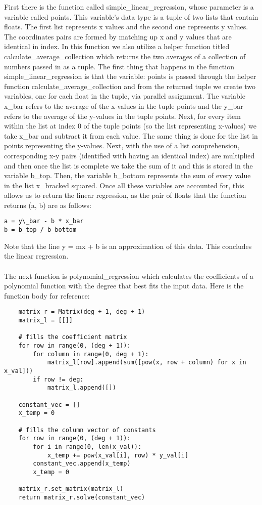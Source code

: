 \documentclass[fontsize=11pt]{article}
\begin{document}
First there is the function called simple\_linear\_regression, whose parameter is a variable called points. This variable’s data type is a tuple of two lists that contain floats. The first list represents x values and the second one represents y values. The coordinates pairs are formed by matching up x and y values that are identical in index. In this function we also utilize a helper function titled calculate\_average\_collection which returns the two averages of a collection of numbers passed in as a tuple. The first thing that happens in the function simple\_linear\_regression is that the variable: points is passed through the helper function calculate\_average\_collection and from the returned tuple we create two variables, one for each float in the tuple, via parallel assignment. The variable x\_bar refers to the average of the x-values in the tuple points and the y\_bar refers to the average of the y-values in the tuple points. Next, for every item within the list at index 0 of the tuple points (so the list representing x-values) we take x\_bar and subtract it from each value. The same thing is done for the list in points representing the y-values. Next, with the use of a list comprehension, corresponding x-y pairs (identified with having an identical index) are multiplied and then once the list is complete we take the sum of it and this is stored in the variable b\_top. Then, the variable b\_bottom represents the sum of every value in the list x\_bracked squared. Once all these variables are accounted for, this allows us to return the linear regression, as the pair of floats that the function returns (a, b) are as follows:

\begin{verbatim}
a = y\_bar - b * x_bar
b = b_top / b_bottom
\end{verbatim}

Note that the line y = mx + b is an approximation of this data. This concludes the linear regression. \\
\\The next function is polynomial\_regression which calculates the coefficients of a polynomial function with the degree that best fits the input data. Here is the function body for reference:

\begin{verbatim}
    matrix_r = Matrix(deg + 1, deg + 1)
    matrix_l = [[]]

    # fills the coefficient matrix
    for row in range(0, (deg + 1)):
        for column in range(0, deg + 1):
            matrix_l[row].append(sum([pow(x, row + column) for x in x_val]))
        if row != deg:
            matrix_l.append([])

    constant_vec = []
    x_temp = 0

    # fills the column vector of constants
    for row in range(0, (deg + 1)):
        for i in range(0, len(x_val)):
            x_temp += pow(x_val[i], row) * y_val[i]
        constant_vec.append(x_temp)
        x_temp = 0

    matrix_r.set_matrix(matrix_l)
    return matrix_r.solve(constant_vec)
\end{verbatim}
\end{document}
